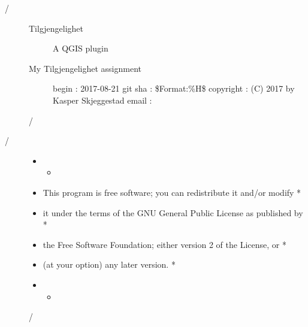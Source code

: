 \documentclass[letterpaper,10pt,english]{sphinxmanual}
\begin{document}
\label{\detokenize{code:module-Tilgjengelighet}}\label{\detokenize{code:tilgjengelighet}}\begin{description}
\item[{/\sphinxstylestrong{***********************************************************************}}] \leavevmode\begin{description}
\item[{Tilgjengelighet}] \leavevmode
A QGIS plugin

\item[{My Tilgjengelighet assignment}] \leavevmode\begin{quote}
\end{quote}

begin                : 2017-08-21
git sha              : \$Format:\%H\$
copyright            : (C) 2017 by Kasper Skjeggestad
email                : 

\end{description}

\sphinxstylestrong{***********************************************************************}/

\item[{/\sphinxstylestrong{***********************************************************************}}] \leavevmode\begin{itemize}
\item {} \begin{itemize}
\item {} 
\end{itemize}

\item {} 
This program is free software; you can redistribute it and/or modify  *

\item {} 
it under the terms of the GNU General Public License as published by  *

\item {} 
the Free Software Foundation; either version 2 of the License, or     *

\item {} 
(at your option) any later version.                                   *

\item {} \begin{itemize}
\item {} 
\end{itemize}

\end{itemize}

\sphinxstylestrong{***********************************************************************}/

\end{description}
\end{document}

